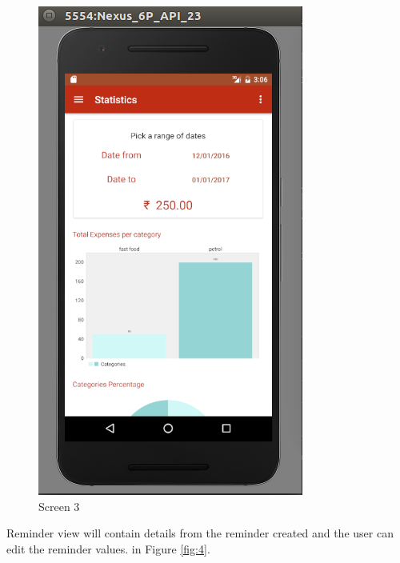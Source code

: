 \begin{figure}[ht]
\centering
\includegraphics[scale=0.5]{images/s3.png}
\caption{Screen 3}
\label{fig:3}
\end{figure}

\noindent Reminder view will contain details from the reminder created and the user can edit
the reminder values. in Figure \ref{fig:4}. \\

